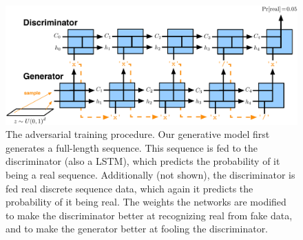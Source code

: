 \begin{figure}[t!]
\begin{center}
\centerline{\includegraphics[width=\textwidth]{GAN.pdf}}
\caption{The adversarial training procedure. Our generative model first generates a full-length sequence. This sequence is fed to the discriminator (also a LSTM), which predicts the probability of it being a real sequence. Additionally (not shown), the discriminator is fed real discrete sequence data, which again it predicts the probability of it being real. The weights the networks are modified to make the discriminator better at recognizing real from fake data, and to make the generator better at fooling the discriminator.}
\label{figure.adversarial}
\end{center}
\end{figure}
